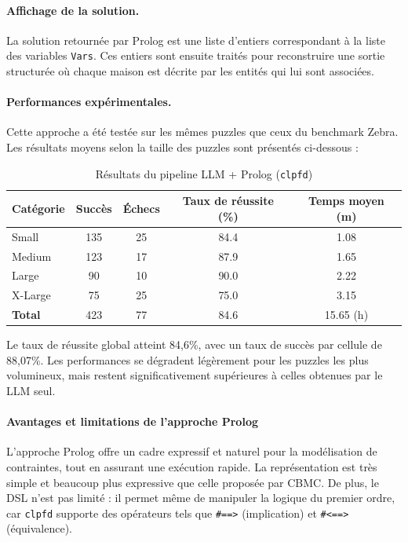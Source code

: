 \documentclass[a4paper,11pt]{article}
\begin{document}
\paragraph{Affichage de la solution.}
La solution retournée par Prolog est une liste d'entiers correspondant à la liste des variables \texttt{Vars}. Ces entiers sont ensuite traités pour reconstruire une sortie structurée où chaque maison est décrite par les entités qui lui sont associées.

\paragraph{Performances expérimentales.}
Cette approche a été testée sur les mêmes puzzles que ceux du benchmark Zebra. Les résultats moyens selon la taille des puzzles sont présentés ci-dessous :

\begin{table}[h!]
    \centering
    \caption{Résultats du pipeline LLM + Prolog (\texttt{clpfd})}
    \label{tab:results-prolog}
    \begin{tabular}{lcccc}
        \toprule
        Catégorie & Succès & Échecs & Taux de réussite (\%) & Temps moyen (m) \\
        \midrule
        Small    & 135 & 25  & \num{84.4} & 1.08 \\
        Medium   & 123 & 17  & \num{87.9} & 1.65 \\
        Large    & 90  & 10  & \num{90.0} & 2.22 \\
        X-Large  & 75  & 25  & \num{75.0} & 3.15 \\
        \midrule
        \textbf{Total} & 423 & 77 & \num{84.6} & 15.65 (h) \\
        \bottomrule
    \end{tabular}
\end{table}

Le taux de réussite global atteint 84,6\%, avec un taux de succès par cellule de 88,07\%. Les performances se dégradent légèrement pour les puzzles les plus volumineux, mais restent significativement supérieures à celles obtenues par le LLM seul.

\paragraph{Avantages et limitations de l'approche Prolog}

L'approche Prolog offre un cadre expressif et naturel pour la modélisation de contraintes, tout en assurant une exécution rapide. La représentation est très simple et beaucoup plus expressive que celle proposée par CBMC. De plus, le DSL n'est pas limité : il permet même de manipuler la logique du premier ordre, car \texttt{clpfd} supporte des opérateurs tels que \texttt{\#==>} (implication) et \texttt{\#<==>} (équivalence).
\end{document}
